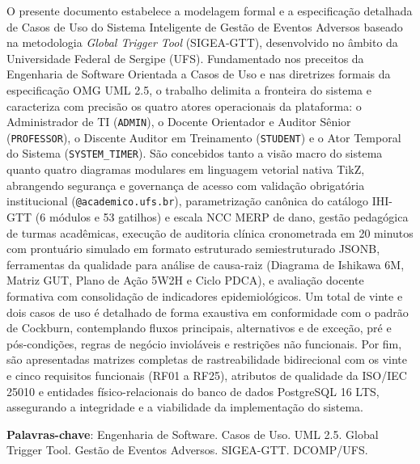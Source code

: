 \begin{resumo}
O presente documento estabelece a modelagem formal e a especificação detalhada de Casos de Uso do Sistema Inteligente de Gestão de Eventos Adversos baseado na metodologia \textit{Global Trigger Tool} (SIGEA-GTT), desenvolvido no âmbito da Universidade Federal de Sergipe (UFS). Fundamentado nos preceitos da Engenharia de Software Orientada a Casos de Uso e nas diretrizes formais da especificação OMG UML 2.5, o trabalho delimita a fronteira do sistema e caracteriza com precisão os quatro atores operacionais da plataforma: o Administrador de TI (\texttt{ADMIN}), o Docente Orientador e Auditor Sênior (\texttt{PROFESSOR}), o Discente Auditor em Treinamento (\texttt{STUDENT}) e o Ator Temporal do Sistema (\texttt{SYSTEM\_TIMER}). São concebidos tanto a visão macro do sistema quanto quatro diagramas modulares em linguagem vetorial nativa TikZ, abrangendo segurança e governança de acesso com validação obrigatória institucional (\texttt{@academico.ufs.br}), parametrização canônica do catálogo IHI-GTT (6 módulos e 53 gatilhos) e escala NCC MERP de dano, gestão pedagógica de turmas acadêmicas, execução de auditoria clínica cronometrada em 20 minutos com prontuário simulado em formato estruturado semiestruturado JSONB, ferramentas da qualidade para análise de causa-raiz (Diagrama de Ishikawa 6M, Matriz GUT, Plano de Ação 5W2H e Ciclo PDCA), e avaliação docente formativa com consolidação de indicadores epidemiológicos. Um total de vinte e dois casos de uso é detalhado de forma exaustiva em conformidade com o padrão de Cockburn, contemplando fluxos principais, alternativos e de exceção, pré e pós-condições, regras de negócio invioláveis e restrições não funcionais. Por fim, são apresentadas matrizes completas de rastreabilidade bidirecional com os vinte e cinco requisitos funcionais (RF01 a RF25), atributos de qualidade da ISO/IEC 25010 e entidades físico-relacionais do banco de dados PostgreSQL 16 LTS, assegurando a integridade e a viabilidade da implementação do sistema.

\vspace{\onelineskip}
\noindent
\textbf{Palavras-chave}: Engenharia de Software. Casos de Uso. UML 2.5. Global Trigger Tool. Gestão de Eventos Adversos. SIGEA-GTT. DCOMP/UFS.
\end{resumo}
